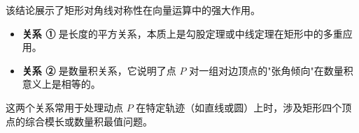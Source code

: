 \begin{explanationbox}
该结论展示了矩形对角线对称性在向量运算中的强大作用。
\begin{itemize}
    \item \textbf{关系 ①} 是长度的平方关系，本质上是勾股定理或中线定理在矩形中的多重应用。
    \item \textbf{关系 ②} 是数量积关系，它说明了点 $P$ 对一组对边顶点的"张角倾向"在数量积意义上是相等的。
\end{itemize}
这两个关系常用于处理动点 $P$ 在特定轨迹（如直线或圆）上时，涉及矩形四个顶点的综合模长或数量积最值问题。
\end{explanationbox}
